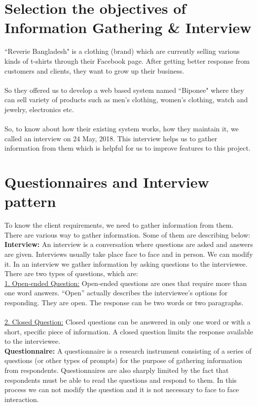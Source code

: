 
  
\section{Selection the objectives of Information Gathering & Interview}

``Reverie Bangladesh" is a clothing (brand) which are currently selling various kinds of t-shirts through their Facebook page. After getting better response from customers and clients, they want to grow up their business.\\\\
So they offered us to develop a web based system named ``Biponee" where they can sell variety of products such as men's clothing, women's clothing, watch and jewelry, electronics etc.\\\\
So, to know about how their existing system works, how they maintain it, we called an interview on 24 May, 2018. This interview helps us to gather information from them which is helpful for us to improve features to this project.

\section{Questionnaires and Interview pattern}
To know the client requirements, we need to gather information from them. There are various way to gather information. Some of them are describing below:\\

\textbf{Interview:} An interview is a conversation where questions are asked and answers are given. Interviews usually take place face to face and in person. We can modify it. In an interview we gather information by asking questions to the interviewee. There are two types of questions, which are:\\
 
  \underline{1. Open-ended Question:} Open-ended questions are ones that require more than one word answers. “Open” actually describes the interviewee’s options for responding. They are open. The response can be two words or two paragraphs. \\\\
\underline{2. Closed Question:} Closed  questions can be answered in only one word or with a short, specific piece of information. A closed question limits the response available to the interviewee. \\
 
\textbf {Questionnaire:} A questionnaire is a research instrument consisting of a series of questions (or other types of prompts) for the purpose of gathering information from respondents. Questionnaires are also sharply limited by the fact that respondents must be able to read the questions and respond to them. In this process we can not modify the question and it is not necessary to face to face interaction.\\

